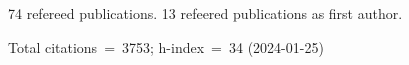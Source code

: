 74 refereed publications. 13 refeered publications as first author.

Total citations~=~3753; h-index~=~34 (2024-01-25)